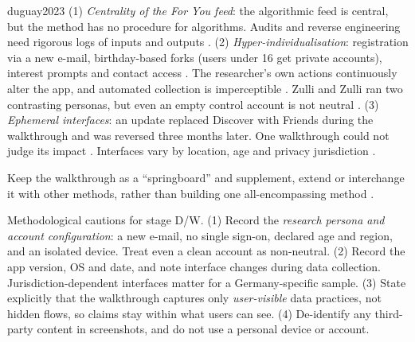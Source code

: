 \begin{papercard}{duguay2023}
 (1) \emph{Centrality of the For You feed}: the algorithmic feed is central, but the method has no procedure for algorithms. Audits and reverse engineering need rigorous logs of inputs and outputs . (2) \emph{Hyper-individualisation}: registration via a new e-mail, birthday-based forks (users under 16 get private accounts), interest prompts and contact access . The researcher's own actions continuously alter the app, and automated collection is imperceptible . Zulli and Zulli ran two contrasting personas, but even an empty control account is not neutral . (3) \emph{Ephemeral interfaces}: an update replaced Discover with Friends during the walkthrough and was reversed three months later. One walkthrough could not judge its impact . Interfaces vary by location, age and privacy jurisdiction .

 Keep the walkthrough as a ``springboard'' and supplement, extend or interchange it with other methods, rather than building one all-encompassing method .

 Methodological cautions for stage D/W. (1) Record the \emph{research persona and account configuration}: a new e-mail, no single sign-on, declared age and region, and an isolated device. Treat even a clean account as non-neutral. (2) Record the app version, OS and date, and note interface changes during data collection. Jurisdiction-dependent interfaces matter for a Germany-specific sample. (3) State explicitly that the walkthrough captures only \emph{user-visible} data practices, not hidden flows, so claims stay within what users can see. (4) De-identify any third-party content in screenshots, and do not use a personal device or account.
\end{papercard}
